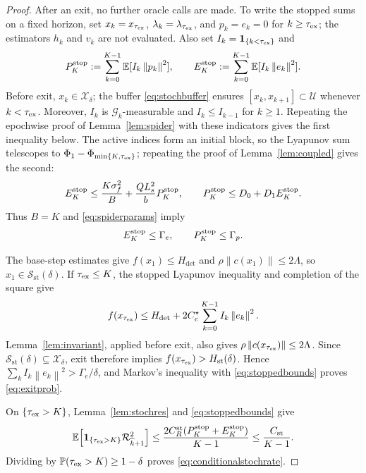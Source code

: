 \documentclass[11pt]{article}
\theoremstyle{definition}
\theoremstyle{remark}
\numberwithin{equation}{section}
\numberwithin{figure}{section}
\numberwithin{table}{section}
\numberwithin{algorithm}{section}
\newcommand{\E}{\mathbb{E}}
\newcommand{\norm}[1]{\left\lVert #1\right\rVert}
\begin{document}
\begin{proof}
After an exit, no further oracle calls are made.  To write the stopped sums on a fixed horizon, set \(x_k=x_{\tau_{\rm ex}}\),
\(\lambda_k=\lambda_{\tau_{\rm ex}}\), and \(p_k=e_k=0\) for
\(k\ge\tau_{\rm ex}\); the estimators \(h_k\) and \(v_k\) are not evaluated. Also set
\(I_k=\mathbf1_{\{k<\tau_{\rm ex}\}}\) and
$$
 P_K^{\rm stop}:=\sum_{k=0}^{K-1}\E[I_k\norm{p_k}^2],
 \qquad
 E_K^{\rm stop}:=\sum_{k=0}^{K-1}\E[I_k\norm{e_k}^2].
$$
Before exit, \(x_k\in\mathcal X_\delta\); the buffer
\eqref{eq:stochbuffer} ensures $[x_k,x_{k+1}]\subset\mathcal U$ whenever $k<\tau_{\rm ex}$.  Moreover, \(I_k\) is \(\mathcal G_k\)-measurable and \(I_k\le I_{k-1}\) for $k\ge1$.  Repeating the epochwise proof of Lemma~\ref{lem:spider} with these indicators gives the first
inequality below.  The active indices form an initial block, so the Lyapunov sum telescopes to
\(\Phi_1-\Phi_{\min\{K,\tau_{\rm ex}\}}\); repeating the proof of
Lemma~\ref{lem:coupled} gives the second:
$$
 E_K^{\rm stop}\le\frac{K\sigma_f^2}{B}
 +\frac{QL_s^2}{b}P_K^{\rm stop},
 \qquad
 P_K^{\rm stop}\le D_0+D_1E_K^{\rm stop}.
$$
Thus \(B=K\) and \eqref{eq:spiderparams} imply
\begin{equation}
 E_K^{\rm stop}\le\Gamma_e,\qquad
 P_K^{\rm stop}\le\Gamma_p.
 \label{eq:stoppedbounds}
\end{equation}

The base-step estimates give \(f(x_1)\le H_{\mathrm{det}}\) and
\(\rho\norm{c(x_1)}\le2\Lambda\), so
\(x_1\in\mathcal S_{\mathrm{st}}(\delta)\).  If \(\tau_{\rm ex}\le K\),
the stopped Lyapunov inequality and completion of the square give
$$
 f(x_{\tau_{\rm ex}})
 \le H_{\mathrm{det}}+
 2C_e^\star\sum_{k=0}^{K-1}I_k\norm{e_k}^2.
$$
Lemma~\ref{lem:invariant}, applied before exit, also gives
\(\rho\norm{c(x_{\tau_{\rm ex}})}\le2\Lambda\).  Since
\(\mathcal S_{\mathrm{st}}(\delta)\subseteq\mathcal X_\delta\), exit
therefore implies
\(f(x_{\tau_{\rm ex}})>H_{\mathrm{st}}(\delta)\).  Hence
\(\sum_kI_k\norm{e_k}^2>\Gamma_e/\delta\), and Markov's inequality
with \eqref{eq:stoppedbounds} proves \eqref{eq:exitprob}.

On \(\{\tau_{\rm ex}>K\}\), Lemma~\ref{lem:stochres} and
\eqref{eq:stoppedbounds} give
$$
 \E\!\left[
 \mathbf1_{\{\tau_{\rm ex}>K\}}\mathcal R_{\widehat{k}+1}^2\right]
 \le\frac{2C_R^{\mathrm{st}}
 (P_K^{\rm stop}+E_K^{\rm stop})}{K-1}
 \le\frac{C_{\mathrm{st}}}{K-1}.
$$
Dividing by
\(\mathbb P(\tau_{\rm ex}>K)\ge1-\delta\) proves
\eqref{eq:conditionalstochrate}.
\end{proof}
\end{document}
